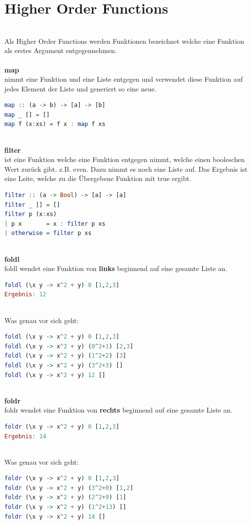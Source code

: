 \section{Higher Order Functions}\qquad\\
Als Higher Order Functions werden Funktionen bezeichnet welche eine Funktion als erstes Argument entgegennehmen.\\
\qquad\\
\textbf{map} \\
nimmt eine Funktion und eine Liste entgegen und verwendet diese Funktion auf jedes Element der Liste und generiert so eine neue. 
\begin{lstlisting}[language=Haskell]
map :: (a -> b) -> [a] -> [b]  
map _ [] = []  
map f (x:xs) = f x : map f xs  
\end{lstlisting}\qquad\\
\textbf{filter}\\
ist eine Funktion welche eine Funktion entgegen nimmt, welche einen booleschen Wert zurück gibt. z.B. even. Dazu nimmt es noch eine Liste auf. Das Ergebnis ist eine Lsite, welche zu die Übergebene Funktion mit true ergibt. 
\begin{lstlisting}[language=Haskell]
filter :: (a -> Bool) -> [a] -> [a]  
filter _ [] = []  
filter p (x:xs)   
| p x       = x : filter p xs  
| otherwise = filter p xs  
\end{lstlisting}\qquad\\
\textbf{foldl}\qquad\\
foldl wendet eine Funktion von \textbf{links} beginnend auf eine gesamte Liste an. \\
\begin{lstlisting}[language=Haskell]
foldl (\x y -> x^2 + y) 0 [1,2,3]
Ergebnis: 12
\end{lstlisting}\qquad\\
Was genau vor sich geht: \\
\begin{lstlisting}[language=Haskell]
foldl (\x y -> x^2 + y) 0 [1,2,3]
foldl (\x y -> x^2 + y) (0^2+1) [2,3]
foldl (\x y -> x^2 + y) (1^2+2) [3]
foldl (\x y -> x^2 + y) (3^2+3) []
foldl (\x y -> x^2 + y) 12 []
\end{lstlisting}\qquad\\
\newline
\textbf{foldr}\qquad\\
foldr wendet eine Funktion von \textbf{rechts} beginnend auf eine gesamte Liste an. \\
\begin{lstlisting}[language=Haskell]
foldr (\x y -> x^2 + y) 0 [1,2,3]
Ergebnis: 14
\end{lstlisting}\qquad\\
Was genau vor sich geht: \\
\begin{lstlisting}[language=Haskell]
foldr (\x y -> x^2 + y) 0 [1,2,3]
foldr (\x y -> x^2 + y) (3^2+0) [1,2]
foldr (\x y -> x^2 + y) (2^2+9) [1]
foldr (\x y -> x^2 + y) (1^2+13) []
foldr (\x y -> x^2 + y) 14 []
\end{lstlisting}

